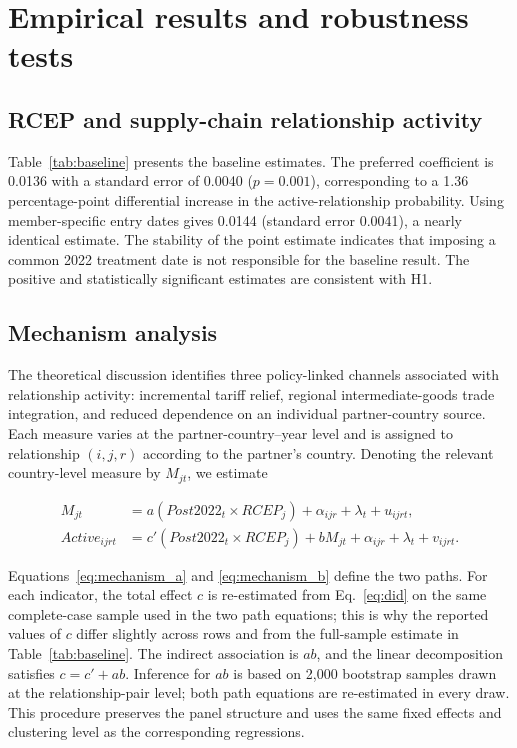 \documentclass[preprint,12pt,authoryear]{elsarticle}
\begin{document}
\section{Empirical results and robustness tests}
\label{sec:empirical}

\subsection{RCEP and supply-chain relationship activity}

Table~\ref{tab:baseline} presents the baseline estimates. The preferred coefficient is 0.0136 with a standard error of 0.0040 ($p=0.001$), corresponding to a 1.36 percentage-point differential increase in the active-relationship probability. Using member-specific entry dates gives 0.0144 (standard error 0.0041), a nearly identical estimate. The stability of the point estimate indicates that imposing a common 2022 treatment date is not responsible for the baseline result. The positive and statistically significant estimates are consistent with H1.



\subsection{Mechanism analysis}

The theoretical discussion identifies three policy-linked channels associated with relationship activity: incremental tariff relief, regional intermediate-goods trade integration, and reduced dependence on an individual partner-country source. Each measure varies at the partner-country--year level and is assigned to relationship $(i,j,r)$ according to the partner's country. Denoting the relevant country-level measure by $M_{jt}$, we estimate

\begin{align}
M_{jt} &= a(Post2022_t\times RCEP_j)+\alpha_{ijr}+\lambda_t+u_{ijrt}, \label{eq:mechanism_a}\\
Active_{ijrt} &= c'(Post2022_t\times RCEP_j)+bM_{jt}+\alpha_{ijr}+\lambda_t+v_{ijrt}. \label{eq:mechanism_b}
\end{align}

Equations~\eqref{eq:mechanism_a} and \eqref{eq:mechanism_b} define the two paths. For each indicator, the total effect $c$ is re-estimated from Eq.~\eqref{eq:did} on the same complete-case sample used in the two path equations; this is why the reported values of $c$ differ slightly across rows and from the full-sample estimate in Table~\ref{tab:baseline}. The indirect association is $ab$, and the linear decomposition satisfies $c=c'+ab$. Inference for $ab$ is based on 2,000 bootstrap samples drawn at the relationship-pair level; both path equations are re-estimated in every draw. This procedure preserves the panel structure and uses the same fixed effects and clustering level as the corresponding regressions.
\end{document}

